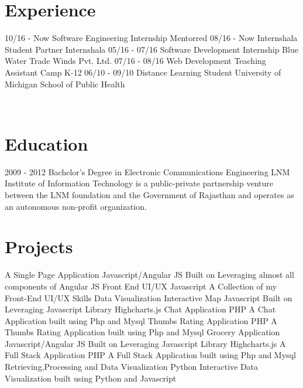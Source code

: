 \documentclass[]{friggeri-cv}
\begin{document}
\section{Experience}
\begin{entrylist}
 \entry
    {10/16 - Now}
    {Software Engineering Internship}
    {Mentorred}
    {}
    \entry
    {08/16 - Now}
    {Internshala Student Partner}
    {Internshala}
    {}
  \entry
    {05/16 - 07/16}
    {Software Development Internship}
    {Blue Water Trade Winds Pvt. Ltd.}
    {}
  \entry
    {07/16 - 08/16}
    {Web Development Teaching Assistant}
    {Camp K-12 }
    {}
    \entry
    {06/10 - 09/10}
    {Distance Learning Student }
    {University of Michigan School of Public Health}
    {}
    
\end{entrylist}
\\
\section{Education}
\begin{entrylist}
  \entry
    {2009 - 2012}
    {Bachelor's Degree in Electronic Communications Engineering}
    {}
    {LNM Institute of Information Technology is a public-private partnership    venture between the LNM foundation and the Government of Rajasthan and     operates as an autonomous non-profit organization.}

\end{entrylist}

\section{Projects}
\begin{entrylist}
\hspace{10 mm} 
    \entry{}
    {A Single Page Application}
    {Javascript/Angular JS}
    {Built on Leveraging almost all components of Angular JS}
     \entry{}
    {Front End UI/UX }
    {Javascript}
    {A Collection of my Front-End UI/UX Skills}
     \entry{}
    {Data Visualization Interactive Map}
    {Javascript}
    {Built on Leveraging Javascript Library Highcharts.js}
    \entry{}
    {Chat Application }
    {PHP}
    {A Chat Application built using Php and Mysql }
    \entry{}
    {Thumbs Rating Application}
    {PHP}
    {A Thumbs Rating Application built using Php and Mysql}
    \entry{}
    {Grocery Application }
    {Javascript/Angular JS}
    {Built on Leveraging Javascript Library Highcharts.js}
    \entry{}
    {A Full Stack Application}
    {PHP}
    {A Full Stack Application built using Php and Mysql}
    \entry{}
    {Retrieving,Processing and Data Visualization}
    {Python}
    {Interactive Data Visualization built using Python and Javascript }
    
\end{entrylist}
\newpage
\end{document}
